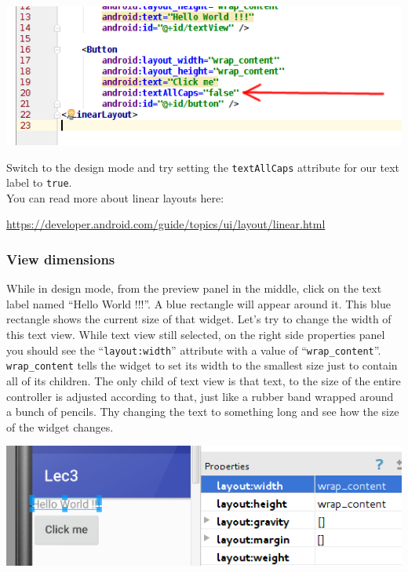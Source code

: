 \begin{center}
	\includegraphics[scale=0.4]{chapters/ch03/images/8_text_case}
\end{center} 

Switch to the design mode and try setting the \texttt{textAllCaps} attribute for our text label to \texttt{true}. \\

You can read more about linear layouts here:

\url{https://developer.android.com/guide/topics/ui/layout/linear.html}

\subsubsection{View dimensions}

While in design mode, from the preview panel in the middle, click on the text label named ``Hello World !!!''. A blue rectangle will appear around it. This blue rectangle shows the current size of that widget. Let's try to change the width of this text view. While text view still selected, on the right side properties panel you should see the ``\texttt{layout:width}'' attribute with a value of ``\texttt{wrap\_content}''. \texttt{wrap\_content} tells the widget to set its width to the smallest size just to contain all of its children. The only child of text view is that text, to the size of the entire controller is adjusted according to that, just like a rubber band wrapped around a bunch of pencils. Thy changing the text to something long and see how the size of the widget changes.

\begin{center}
	\includegraphics[scale=0.4]{chapters/ch03/images/9_layout_width}
\end{center} 


